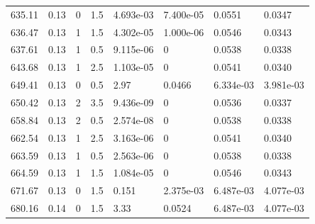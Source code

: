 \documentclass[preview]{standalone}
\begin{document}
{{{\begin{tabular}{L{1.2cm}C{1.2cm} C{0.3cm}C{0.5cm} C{1.4cm}C{1.4cm} C{1.4cm}C{1.4cm}}
  635.11  &  0.13  & 0     & 1.5 &  4.693e-03  & 7.400e-05  & 0.0551 &  0.0347   \\ 
  636.47  &  0.13  & 1     & 1.5 &  4.302e-05  & 1.000e-06  & 0.0546 &  0.0343   \\ 
  637.61  &  0.13  & 1     & 0.5 &  9.115e-06  & 0  & 0.0538 &  0.0338   \\ 
  643.68  &  0.13  & 1     & 2.5 &  1.103e-05  & 0  & 0.0541 &  0.0340   \\ 
  649.41  &  0.13  & 0     & 0.5 &  2.97  & 0.0466  & 6.334e-03 &  3.981e-03   \\ 
  650.42  &  0.13  & 2     & 3.5 &  9.436e-09  & 0  & 0.0536 &  0.0337   \\ 
  658.84  &  0.13  & 2     & 0.5 &  2.574e-08  & 0  & 0.0538 &  0.0338   \\ 
  662.54  &  0.13  & 1     & 2.5 &  3.163e-06  & 0  & 0.0541 &  0.0340   \\ 
  663.59  &  0.13  & 1     & 0.5 &  2.563e-06  & 0  & 0.0538 &  0.0338   \\ 
  664.59  &  0.13  & 1     & 1.5 &  1.084e-05  & 0  & 0.0546 &  0.0343   \\ 
  671.67  &  0.13  & 0     & 1.5 &  0.151  & 2.375e-03  & 6.487e-03 &  4.077e-03   \\ 
  680.16  &  0.14  & 0     & 1.5 &  3.33  & 0.0524  & 6.487e-03 &  4.077e-03   \\ 
\hline 
\end{tabular} 

}}}
\end{document}
